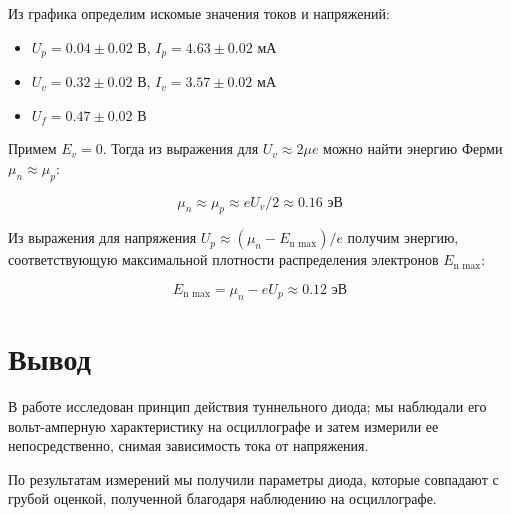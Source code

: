 \documentclass[a4paper,12pt]{article}
\begin{document}
Из графика определим искомые значения токов и напряжений:
	
\begin{itemize}
    \centering
    \item $ U_p = 0.04 \pm 0.02 $ В, $ I_p = 4.63 \pm 0.02 $ мА
    \item $ U_v = 0.32 \pm 0.02 $ В, $ I_v = 3.57 \pm 0.02 $ мА
    \item $ U_f = 0.47 \pm 0.02 $ В
\end{itemize} 

Примем $E_v = 0$. Тогда из выражения для $U_v \approx 2\mu e$ можно найти энергию Ферми $\mu_n \approx \mu_p$:

\[ \mu_n \approx \mu_p \approx eU_v/2 \approx 0.16 \text{ эВ} \]

Из выражения для напряжения $U_p \approx (\mu_n - E_\text{n max})/e$ получим энергию, соответствующую максимальной плотности распределения электронов $E_\text{n max}$:

\[ E_\text{n max} = \mu_n - eU_p \approx 0.12 \text{ эВ} \] 

\section{Вывод} 
В работе исследован принцип действия туннельного диода; мы наблюдали его вольт-амперную характеристику на осциллографе и затем измерили ее непосредственно, снимая зависимость тока от напряжения. 
	
По результатам измерений мы получили параметры диода, которые совпадают с грубой оценкой, полученной благодаря наблюдению на осциллографе.	
\end{document}
